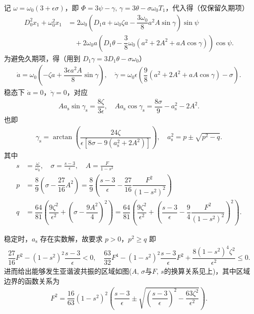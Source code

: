 记 \(\omega = \omega_0 (3 + \epsilon \sigma)\)，即 \(\Phi = 3\psi - \gamma,\,\gamma = 3\theta - \sigma \omega_0 T_1\)，代入得（仅保留久期项）
\begin{align*}
	D_0^2 x_1 + \omega_0^2 x_1 &= 2 \omega_0 \left( D_1 a + \omega_0 \zeta a - \dfrac{3 \omega_0}{8} a^2 A \sin\gamma \right) \sin\psi \\
	&\quad + 2 \omega_0 a \left( D_1 \theta - \dfrac{3}{8} \omega_0 (a^2 + 2A^2 + aA \cos\gamma) \right) \cos\psi.
\end{align*}
为避免久期项，得（用到 \(D_1 \gamma = 3D_1 \theta - \sigma \omega_0\)）
\begin{align*}
	\dot{a} = \omega_0 \left( -\zeta a + \dfrac{3\epsilon a^2 A}{8} \sin\gamma \right),\quad \dot{\gamma} = \omega_0 \epsilon \left( \dfrac{9}{8} (a^2 + 2A^2 + aA \cos\gamma) - \sigma \right).
\end{align*}
稳态下 \(\dot{a} = 0\)，\(\dot{\gamma} = 0\)，对应
\begin{align*}
	A a_{\mathrm{s}} \sin\gamma_{\mathrm{s}} = \dfrac{8\zeta}{3\epsilon},\quad A a_{\mathrm{s}} \cos\gamma_{\mathrm{s}} = \dfrac{8\sigma}{9} - a_{\mathrm{s}}^2 - 2A^2.
\end{align*}
也即
\begin{align*}
	\gamma_{\mathrm{s}} = \arctan\left( \dfrac{24\zeta}{\epsilon\left[8\sigma - 9(a_{\mathrm{s}}^2 + 2A^2)\right]} \right), \quad a_{\mathrm{s}}^2 = p \pm \sqrt{p^2 - q}.
\end{align*}
其中
\begin{align*}
	s &= \frac{\omega}{\omega_0},\quad\sigma =\frac{s - 3}{\epsilon},\quad A =\frac{F}{1-s^2}\\
	p &= \dfrac{8}{9} \left( \sigma - \dfrac{27}{16} A^2 \right) = \dfrac{8}{9} \left( \dfrac{s - 3}{\epsilon} - \dfrac{27}{16} \dfrac{F^2}{(1 - s^2)^2} \right)\\
		q &= \dfrac{64}{81} \left( \dfrac{9\zeta^2}{\epsilon^2} + \left( \sigma - \dfrac{9A^2}{4} \right)^2 \right) = \dfrac{64}{81} \left( \dfrac{9\zeta^2}{\epsilon^2} + \left( \dfrac{s - 3}{\epsilon} - \dfrac{9}{4} \dfrac{F^2}{(1 - s^2)^2} \right)^2 \right).
\end{align*}

稳定时，\(a_{\mathrm{s}}\) 存在实数解，故要求 \(p > 0\)，\(p^2 \geq q\) 即
\begin{align*}
	\dfrac{27}{16} F^2 - (1 - s^2)^2 \dfrac{s - 3}{\epsilon} < 0,\quad
	\dfrac{63}{32} F^4 - (1 - s^2)^2 \dfrac{s - 3}{\epsilon} F^2 + \dfrac{8 (1 - s^2)^4 \zeta^2}{\epsilon^2} \leq 0.
\end{align*}
进而给出能够发生亚谐波共振的区域如图(\(A,\,\sigma\)与\(F,\,s\)的换算关系见上)，其中区域边界的函数关系为
\begin{align*}
	F^2 = \dfrac{16}{63} (1 - s^2)^2 \left( \dfrac{s - 3}{\epsilon} \pm \sqrt{\left( \dfrac{s - 3}{\epsilon} \right)^2 - \dfrac{63\zeta^2}{\epsilon^2}} \right).
\end{align*}

